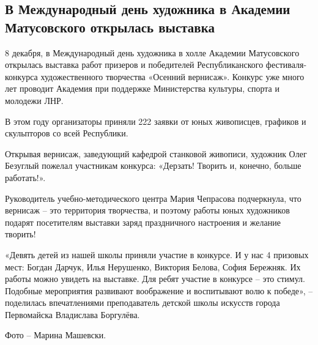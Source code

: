  
 
 
 
 
\subsection{В Международный день художника в Академии Матусовского открылась выставка}
\label{sec:08_12_2021.stz.edu.lnr.lgaki.1.vystavka_den_hudozhnika}


8 декабря, в Международный день художника в холле Академии Матусовского
открылась выставка работ призеров и победителей Республиканского
фестиваля-конкурса художественного творчества «Осенний вернисаж». Конкурс уже
много лет проводит Академия при поддержке Министерства культуры, спорта и
молодежи ЛНР.


В этом году организаторы приняли 222 заявки от юных живописцев, графиков и
скульпторов со всей Республики.

Открывая вернисаж, заведующий кафедрой станковой живописи, художник Олег
Безуглый пожелал участникам конкурса: «Дерзать! Творить и, конечно, больше
работать!».


Руководитель учебно-методического центра Мария Чепрасова подчеркнула, что
вернисаж – это территория творчества, и поэтому работы юных художников подарят
посетителям выставки заряд праздничного настроения и желание творить!


«Девять детей из нашей школы приняли участие в конкурсе. И у нас 4 призовых
мест: Богдан Дарчук, Илья Нерушенко, Виктория Белова, София Бережняк. Их работы
можно увидеть на выставке. Для ребят участие в конкурсе – это стимул. Подобные
мероприятия развивают воображение и воспитывают волю к победе», – поделилась
впечатлениями преподаватель детской школы искусств города Первомайска
Владислава Боргулёва.


Фото – Марина Машевски.

